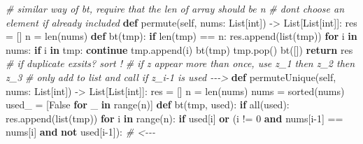 \documentclass[
]{article}
\newenvironment{Shaded}{}{}
\newcommand{\BuiltInTok}[1]{#1}
\newcommand{\CommentTok}[1]{\textcolor[rgb]{0.38,0.63,0.69}{\textit{#1}}}
\newcommand{\ControlFlowTok}[1]{\textcolor[rgb]{0.00,0.44,0.13}{\textbf{#1}}}
\newcommand{\DecValTok}[1]{\textcolor[rgb]{0.25,0.63,0.44}{#1}}
\newcommand{\KeywordTok}[1]{\textcolor[rgb]{0.00,0.44,0.13}{\textbf{#1}}}
\newcommand{\NormalTok}[1]{#1}
\newcommand{\OperatorTok}[1]{\textcolor[rgb]{0.40,0.40,0.40}{#1}}
\newcommand{\VariableTok}[1]{\textcolor[rgb]{0.10,0.09,0.49}{#1}}
\begin{document}
\begin{Shaded}
\begin{Highlighting}[]
\CommentTok{\# similar way of bt, require that the len of array should be n}
\CommentTok{\# don\textquotesingle{}t choose an element if already included}
	\KeywordTok{def}\NormalTok{ permute(}\VariableTok{self}\NormalTok{, nums: List[}\BuiltInTok{int}\NormalTok{]) }\OperatorTok{{-}\textgreater{}}\NormalTok{ List[List[}\BuiltInTok{int}\NormalTok{]]:}
\NormalTok{        res }\OperatorTok{=}\NormalTok{ []}
\NormalTok{        n }\OperatorTok{=} \BuiltInTok{len}\NormalTok{(nums)}
        \KeywordTok{def}\NormalTok{ bt(tmp):}
            \ControlFlowTok{if} \BuiltInTok{len}\NormalTok{(tmp) }\OperatorTok{==}\NormalTok{ n:}
\NormalTok{                res.append(}\BuiltInTok{list}\NormalTok{(tmp))}
            \ControlFlowTok{for}\NormalTok{ i }\KeywordTok{in}\NormalTok{ nums:}
                \ControlFlowTok{if}\NormalTok{ i }\KeywordTok{in}\NormalTok{ tmp: }\ControlFlowTok{continue}
\NormalTok{                tmp.append(i)}
\NormalTok{                bt(tmp)}
\NormalTok{                tmp.pop()}
\NormalTok{        bt([])}
        \ControlFlowTok{return}\NormalTok{ res}
\CommentTok{\# if duplicate exsits? sort ! }
\CommentTok{\# if z appear more than once, use z\_1 then z\_2 then z\_3 }
\CommentTok{\# only add to list and call if z\_i{-}1 is used {-}{-}{-}\textgreater{}}
    \KeywordTok{def}\NormalTok{ permuteUnique(}\VariableTok{self}\NormalTok{, nums: List[}\BuiltInTok{int}\NormalTok{]) }\OperatorTok{{-}\textgreater{}}\NormalTok{ List[List[}\BuiltInTok{int}\NormalTok{]]:}
\NormalTok{        res }\OperatorTok{=}\NormalTok{ []}
\NormalTok{        n }\OperatorTok{=} \BuiltInTok{len}\NormalTok{(nums)}
\NormalTok{        nums }\OperatorTok{=} \BuiltInTok{sorted}\NormalTok{(nums)}
\NormalTok{        used\_ }\OperatorTok{=}\NormalTok{ [}\VariableTok{False} \ControlFlowTok{for}\NormalTok{ \_ }\KeywordTok{in} \BuiltInTok{range}\NormalTok{(n)]}
        \KeywordTok{def}\NormalTok{ bt(tmp, used):}
            \ControlFlowTok{if} \BuiltInTok{all}\NormalTok{(used):}
\NormalTok{                res.append(}\BuiltInTok{list}\NormalTok{(tmp))}
            \ControlFlowTok{for}\NormalTok{ i }\KeywordTok{in} \BuiltInTok{range}\NormalTok{(n):}
                \ControlFlowTok{if}\NormalTok{ used[i] }\KeywordTok{or}\NormalTok{ (i }\OperatorTok{!=} \DecValTok{0} \KeywordTok{and}\NormalTok{ nums[i}\OperatorTok{{-}}\DecValTok{1}\NormalTok{] }\OperatorTok{==}\NormalTok{ nums[i] }\KeywordTok{and} \KeywordTok{not}\NormalTok{ used[i}\OperatorTok{{-}}\DecValTok{1}\NormalTok{]):  }\CommentTok{\# \textless{}{-}{-}{-}}

\end{Highlighting}
\end{Shaded}
\end{document}
